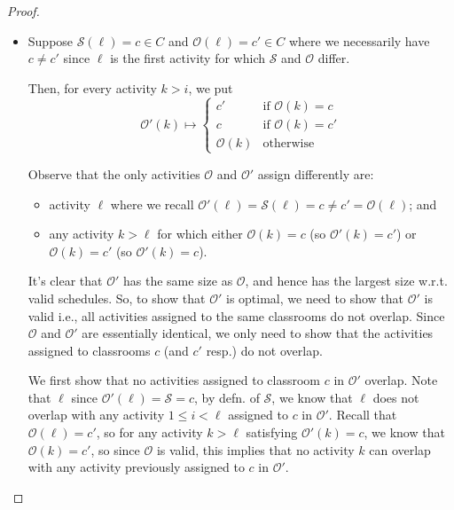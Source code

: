 \documentclass{article}
\theoremstyle{plain}%
\theoremstyle{definition}
\theoremstyle{remark}
\begin{document}
\begin{proof}
\begin{itemize}
            \item Suppose $\mathcal{S}(\ell) = c \in C$
                and $\mathcal{O}(\ell) = c' \in C$ where we necessarily have $c
                \neq c'$ since $\ell$ is the first activity for which
                $\mathcal{S}$ and $\mathcal{O}$ differ.

            Then, for every activity $k > i$, we put
            \begin{equation}
                \mathcal{O}'(k) \mapsto
                    \begin{cases}
                        c' & \text{if $\mathcal{O}(k) = c$} \\
                        c & \text{if $\mathcal{O}(k) = c'$} \\
                        \mathcal{O}(k) & \text{otherwise}
                    \end{cases}
            \end{equation}

            Observe that the only activities $\mathcal{O}$ and $\mathcal{O}'$
                assign differently are:
            \begin{itemize}
                \item activity $\ell$ where we recall $\mathcal{O}'(\ell) = \mathcal{S}(\ell) =c \neq c' = \mathcal{O}(\ell)$; and
                \item any activity $k > \ell$ for which either 
                    $\mathcal{O}(k) = c$ (so $\mathcal{O}'(k) = c'$)
                    or $\mathcal{O}(k) =c'$ (so $\mathcal{O}'(k) = c$).
            \end{itemize}

            It's clear that $\mathcal{O}'$ has the same size as $\mathcal{O}$,
                and hence has the largest size w.r.t. valid schedules.
            So, to show that $\mathcal{O}'$ is optimal, we need to show that
                $\mathcal{O}'$ is valid i.e., all activities assigned to the
                same classrooms do not overlap.
            Since $\mathcal{O}$ and $\mathcal{O}'$ are essentially identical,
                we only need to show that the activities assigned to classrooms
                $c$ (and $c'$ resp.)
                do not overlap.

            We first show that no activities assigned to classroom $c$
                in $\mathcal{O}'$ overlap.
            Note that $\ell$ since $\mathcal{O}'(\ell) = \mathcal{S} = c$,
                by defn. of $\mathcal{S}$,
                    we know that $\ell$ does not overlap with any activity 
                    $1 \le i < \ell$ assigned to $c$ in $\mathcal{O}'$.
            Recall that $\mathcal{O}(\ell) = c'$, so for any activity $k > \ell$ 
                satisfying $\mathcal{O}'(k) = c$, we know that $\mathcal{O}(k) = c'$,
                so since $\mathcal{O}$ is valid, this implies that no activity
                $k$ can overlap with any activity previously assigned to $c$ in
                $\mathcal{O}'$.


\end{itemize}
\end{proof}
\end{document}

